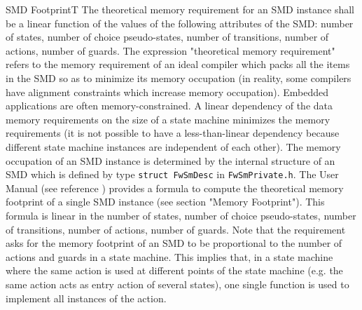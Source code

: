 \documentclass[a4paper,10pt]{article}
\newenvironment{fw_req_note}[7]
{\addtocounter{subsubsection}{1}
	\hspace{0.2cm}\textbf{FW-\arabic{section}.\arabic{subsection}.\arabic{subsubsection}/#2
	\hspace{0.8cm} #1}
	\vspace{-10pt}
\begin{longtable}{p{2.7cm}P{8.5cm}}
\hline
\textsc{Requirement} & #3 \\
\textsc{Note} & #4 \\
\textsc{Justification} & #5 \\
\textsc{Implementation} & #6  \\ 
\textsc{Verification} & #7  \\
\hline
}
{\end{longtable}}
\begin{document}
\begin{fw_req_note}{SMD Footprint}{T}
{The theoretical memory requirement for an SMD instance shall 
be a linear function of the values of the following attributes 
of the SMD: number of states, number of choice pseudo-states, number of transitions, 
number of actions, number of guards.}
{The expression "theoretical memory requirement" refers to the memory requirement 
of an ideal compiler which packs all the items in the SMD so as to minimize its memory 
occupation (in reality, some compilers have alignment constraints which increase memory occupation).}
{Embedded applications are often memory-constrained. A linear 
dependency of the data memory requirements on the size of a state machine minimizes 
the memory requirements (it is not possible to have a less-than-linear dependency 
because different state machine instances are independent of each other).}
{The memory occupation of an SMD instance is determined by the 
internal structure of an SMD which is defined by type 
\texttt{struct FwSmDesc} in \texttt{FwSmPrivate.h}.} 
{The User Manual (see reference \cite{ref:um}) provides a formula to compute the theoretical 
memory footprint of a single SMD instance (see section "Memory Footprint"). 
This formula is linear in the number of states, number of choice 
pseudo-states, number of transitions, number of actions, 
number of guards. Note that the requirement asks for the memory footprint of an SMD to 
be proportional to the number of actions and guards in a state machine. 
This implies that, in a state machine where the same action is used at different points 
of the state machine (e.g. the same action acts as entry action of several states), one 
single function is used to implement all instances of the action.}
\end{fw_req_note}
\end{document}
